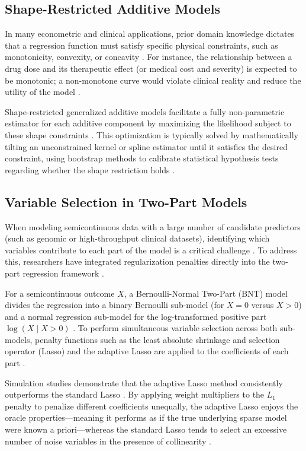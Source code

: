 \subsection{Shape-Restricted Additive Models}

In many econometric and clinical applications, prior domain knowledge dictates that a regression function must satisfy specific physical constraints, such as monotonicity, convexity, or concavity \cite{hall2001, meyer2018}. For instance, the relationship between a drug dose and its therapeutic effect (or medical cost and severity) is expected to be monotonic; a non-monotone curve would violate clinical reality and reduce the utility of the model \cite{hall2001}. 

Shape-restricted generalized additive models facilitate a fully non-parametric estimator for each additive component by maximizing the likelihood subject to these shape constraints \cite{meyer2018}. This optimization is typically solved by mathematically tilting an unconstrained kernel or spline estimator until it satisfies the desired constraint, using bootstrap methods to calibrate statistical hypothesis tests regarding whether the shape restriction holds \cite{hall2001}.

\subsection{Variable Selection in Two-Part Models}

When modeling semicontinuous data with a large number of candidate predictors (such as genomic or high-throughput clinical datasets), identifying which variables contribute to each part of the model is a critical challenge \cite{olsen2001, cragg1971}. To address this, researchers have integrated regularization penalties directly into the two-part regression framework \cite{olsen2001, cragg1971}.

For a semicontinuous outcome $X$, a Bernoulli-Normal Two-Part (BNT) model divides the regression into a binary Bernoulli sub-model (for $X = 0$ versus $X > 0$) and a normal regression sub-model for the log-transformed positive part $\log(X \mid X > 0)$ \cite{olsen2001, cragg1971}. To perform simultaneous variable selection across both sub-models, penalty functions such as the least absolute shrinkage and selection operator (Lasso) and the adaptive Lasso are applied to the coefficients of each part \cite{olsen2001, cragg1971}. 

Simulation studies demonstrate that the adaptive Lasso method consistently outperforms the standard Lasso \cite{cragg1971}. By applying weight multipliers to the $L_1$ penalty to penalize different coefficients unequally, the adaptive Lasso enjoys the oracle properties—meaning it performs as if the true underlying sparse model were known a priori—whereas the standard Lasso tends to select an excessive number of noise variables in the presence of collinearity \cite{cragg1971, zou2006adaptive}.

